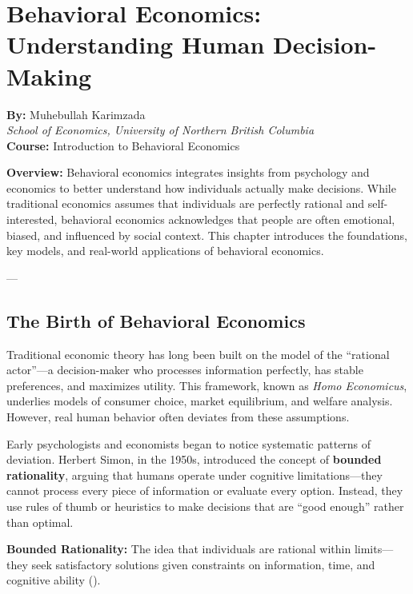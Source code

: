 \documentclass[11pt]{book}
\begin{document}
\chapter*{Behavioral Economics: Understanding Human Decision-Making}

\begin{center}
\textbf{By:} Muhebullah Karimzada\\
\textit{School of Economics, University of Northern British Columbia} \\
\vspace{1em}
\textbf{Course:} Introduction to Behavioral Economics
\end{center}

\vspace{1em}

\noindent
\textbf{Overview:}  
Behavioral economics integrates insights from psychology and economics to better understand how individuals actually make decisions. While traditional economics assumes that individuals are perfectly rational and self-interested, behavioral economics acknowledges that people are often emotional, biased, and influenced by social context. This chapter introduces the foundations, key models, and real-world applications of behavioral economics.

---

\section*{The Birth of Behavioral Economics}

Traditional economic theory has long been built on the model of the ``rational actor''—a decision-maker who processes information perfectly, has stable preferences, and maximizes utility. This framework, known as \textit{Homo Economicus}, underlies models of consumer choice, market equilibrium, and welfare analysis. However, real human behavior often deviates from these assumptions.

Early psychologists and economists began to notice systematic patterns of deviation. Herbert Simon, in the 1950s, introduced the concept of \textbf{bounded rationality}, arguing that humans operate under cognitive limitations—they cannot process every piece of information or evaluate every option. Instead, they use rules of thumb or heuristics to make decisions that are ``good enough'' rather than optimal.

\begin{definitionbox}
\textbf{Bounded Rationality:} The idea that individuals are rational within limits—they seek satisfactory solutions given constraints on information, time, and cognitive ability (\citealp{Simon1955}).
\end{definitionbox}
\end{document}
